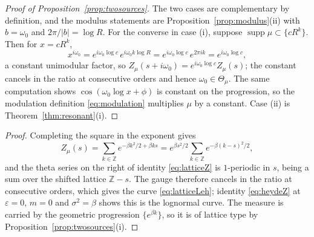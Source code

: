 \documentclass[sn-mathphys-num]{sn-jnl}
\theoremstyle{thmstyleone}%
\theoremstyle{thmstyletwo}%
\theoremstyle{thmstylethree}%
\theoremstyle{thmstyleone}%
\providecommand{\Z}{\mathbb{Z}}
\providecommand{\supp}{\operatorname{supp}}
\begin{document}
\begin{appendices}
		\begin{proof}[Proof of Proposition~\ref{prop:twosources}]
			The two cases are complementary by definition, and the modulus
			statements are Proposition~\ref{prop:modulus}(ii) with
			$b=\omega_0$ and $2\pi/|b|=\log R$. For the converse in case (i),
			suppose $\supp\mu\subset\{cR^{k}\}$. Then for $x=cR^k$,
			\begin{equation}\label{eq:latticechar}
				x^{i\omega_0}=e^{i\omega_0\log c}\,e^{i\omega_0k\log R}
				=e^{i\omega_0\log c}\,e^{2\pi ik}
				=e^{i\omega_0\log c},
			\end{equation}
			a constant unimodular factor, so
			$Z_\mu(s+i\omega_0)=e^{i\omega_0\log c}Z_\mu(s)$; the constant
			cancels in the ratio at consecutive orders and hence
			$\omega_0\in\Theta_\mu$. The same computation shows
			$\cos(\omega_0\log x+\phi)$ is constant on the progression, so the
			modulation definition \eqref{eq:modulation} multiplies $\mu$ by a constant.
			Case (ii) is Theorem~\ref{thm:resonant}(i).
		\end{proof}
		
		\proplatticecompanion*
		
		\begin{proof}
			Completing the square in the exponent gives
			\begin{equation}\label{eq:latticeZ}
				Z_\mu(s)=\sum_{k\in\Z}e^{-\beta k^{2}/2+\beta ks}
				=e^{\beta s^{2}/2}\sum_{k\in\Z}e^{-\beta(k-s)^{2}/2},
			\end{equation}
			and the theta series on the right of identity \eqref{eq:latticeZ}
			is $1$-periodic in $s$, being a sum over the shifted lattice
			$\Z-s$. The gauge therefore cancels in the ratio at consecutive
			orders, which gives the curve \eqref{eq:latticeLeh}; identity
			\eqref{eq:heydeZ} at $\varepsilon=0$, $m=0$ and
			$\sigma^2=\beta$ shows this is the lognormal curve. The
			measure is carried by the geometric progression
			$\{e^{\beta k}\}$, so it is of lattice type by
			Proposition~\ref{prop:twosources}(i).
		\end{proof}
		
		\corfrontier*
		

\end{appendices}
\end{document}
